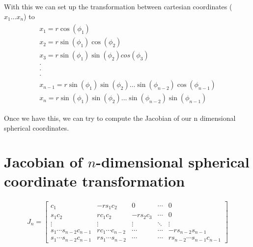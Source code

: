 \documentclass{article}
\begin{document}
With this we can set up the transformation between cartesian coordinates ($x_1 \dots x_n$) to
\begin{align*}
    \begin{array}{c}
        x_1 = r\cos(\phi_1) \\
        x_2 = r\sin(\phi_1)\cos(\phi_2) \\
        x_3 = r\sin(\phi_1)\sin(\phi_2)cos(\phi_3) \\
        \cdot\\
        \cdot\\
        \cdot\\
        x_{n-1} = r\sin(\phi_1)\sin(\phi_2)\dots\sin(\phi_{n-2})\cos(\phi_{n-1}) \\
        x_{n} = r\sin(\phi_1)\sin(\phi_2)\dots\sin(\phi_{n-2})\sin(\phi_{n-1}) 
    \end{array}
\end{align*}
\begin{comment}
We can express the arbitrary coordinate $x_i$ as 

\begin{align*}
    x_i = r\prod_{j=1}^{i-1}sin(\phi_j)cos(\phi_i)
\end{align*}

where  $1 \le i \leq n-1$. 

For $x_n$, we have a different formula. This is because $\phi_{n-1}$ behaves differently from the other angles.

\begin{align*}
    x_n = r\prod_{j=1}^{n-2}sin(\phi_j)sin(\phi_{n-1})
\end{align*}
\end{comment}
Once we have this, we can try to compute the Jacobian of our n dimensional spherical coordinates.

\section*{Jacobian of $n$-dimensional spherical coordinate transformation}   
\begin{align*}
    J_n =
    \begin{bmatrix}
        c_1 & -r s_1 c_2 & 0 & \cdots & 0 \\
        s_1 c_2 & r c_1 c_2 & -r s_2 c_3 & \cdots & 0 \\
        \vdots & \vdots & \vdots & \ddots & \vdots \\
        s_1 \cdots s_{n-2} c_{n-1} & r c_1 \cdots c_{n-2} & \cdots & \cdots & -r s_{n-2} s_{n-1} \\
        s_1 \cdots s_{n-2} c_{n-1} & r s_1 \cdots s_{n-2} & \cdots & \cdots & r s_{n-2} \cdots s_{n-1} c_{n-1}
    \end{bmatrix}
\end{align*}
\end{document}

